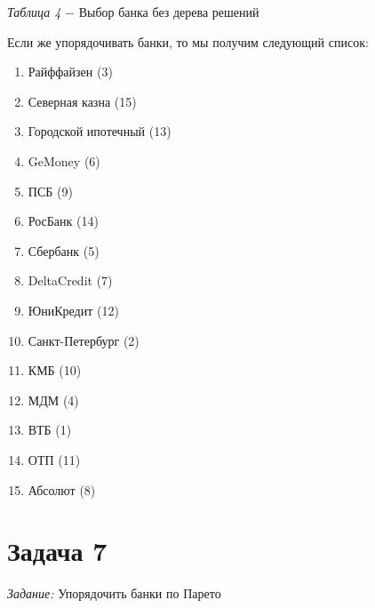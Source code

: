 \documentclass[14pt,fleqn]{extarticle}
\begin{document}
	\begin{center}
		\textit{Таблица 4} $-$ Выбор банка без дерева решений
	\end{center}
	Если же упорядочивать банки, то мы получим следующий список:
	\begin{enumerate}[nolistsep]
		\item Райффайзен (3)
		\item Северная казна (15)
		\item Городской ипотечный (13)
		\item GeMoney (6)
		\item ПСБ (9)
		\item РосБанк (14)
		\item Сбербанк (5)
		\item DeltaCredit (7)
		\item ЮниКредит (12)
		\item Санкт-Петербург (2)
		\item КМБ (10)
		\item МДМ (4)
		\item ВТБ (1)
		\item ОТП (11)
		\item Абсолют (8)
	\end{enumerate}
	\newpage
	\section*{Задача 7}
	\textit{Задание:} Упорядочить банки по Парето\\
	
\end{document}
